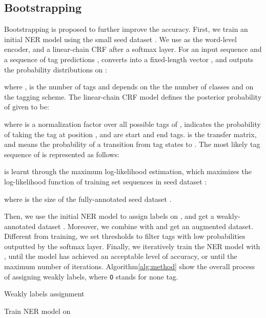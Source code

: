 \documentclass[10pt, conference, compsocconf]{IEEEtran}
\begin{document}
\subsection{Bootstrapping}




Bootstrapping is proposed to further improve the accuracy.
First, we train an initial NER model  using the small seed dataset .
We use  as the word-level encoder, and a linear-chain CRF after a softmax layer.
For an input sequence  and 
a sequence of tag predictions , 
 converts  into a fixed-length vector , and outputs the
probability distributions  on :

    where , 
     is the number of tags and depends on the the number of classes and on the tagging scheme.
The linear-chain CRF model defines the posterior probability of 
 given  to be:

    where  is a normalization factor over all possible tags of , 
       indicates the probability of taking the  tag at position ,
     and  are start and end tags.
     is the transfer matrix, and 
      means the probability of 
     a transition from tag states  to .
    The most likely tag sequence of  is represented as follows:
    
      is learnt through the maximum log-likelihood estimation, 
    which maximizes the log-likelihood function  of 
    training set sequences in seed dataset :
    
    where  is the size of the fully-annotated seed dataset .

 Then, we use the initial NER model  to assign labels on , and get a
 weakly-annotated dataset . Moreover,
 we combine  with  and get
 an augmented dataset.
 Different from training, we set thresholds  to filter tags with low probabilities outputted by the 
 softmax layer. Finally, we iteratively train the NER model with ,
 until the model has achieved an acceptable level of accuracy,
or until the maximum number of iterations. 
Algorithm\ref{alg:method} show the overall process of assigning weakly labels,
where {\tt O} stands for none tag.

\begin{algorithm}[h]
    \caption{Weakly labels assignment}
    \label{alg:method}
    \SetAlgoNoLine
        Train NER model  on 
        \\
        \Return{} 
  \end{algorithm}
\end{document}
